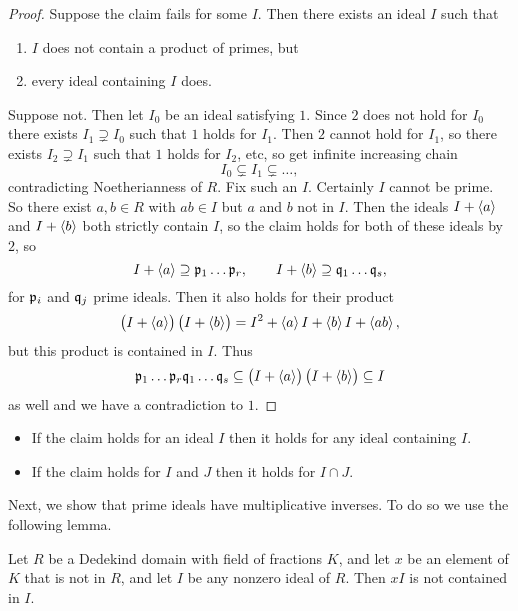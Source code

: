 \begin{proof}
Suppose the claim fails for some $ I $. Then there exists an ideal $ I $ such that
\begin{enumerate}
\item $ I $ does not contain a product of primes, but
\item every ideal containing $ I $ does.
\end{enumerate}
Suppose not. Then let $ I_0 $ be an ideal satisfying $ 1 $. Since $ 2 $ does not hold for $ I_0 $ there exists $ I_1 \supsetneq I_0 $ such that $ 1 $ holds for $ I_1 $. Then $ 2 $ cannot hold for $ I_1 $, so there exists $ I_2 \supsetneq I_1 $ such that $ 1 $ holds for $ I_2 $, etc, so get infinite increasing chain
$$ I_0 \subsetneq I_1 \subsetneq \dots, $$
contradicting Noetherianness of $ R $. Fix such an $ I $. Certainly $ I $ cannot be prime. So there exist $ a, b \in R $ with $ ab \in I $ but $ a $ and $ b $ not in $ I $. Then the ideals $ I + \left\langle a \right\rangle $ and $ I + \left\langle b \right\rangle $ both strictly contain $ I $, so the claim holds for both of these ideals by $ 2 $, so
$$ I + \left\langle a \right\rangle \supseteq \mathfrak{p}_1 \dots \mathfrak{p}_r, \qquad I + \left\langle b \right\rangle \supseteq \mathfrak{q}_1 \dots \mathfrak{q}_s, $$
for $ \mathfrak{p}_i $ and $ \mathfrak{q}_j $ prime ideals. Then it also holds for their product
$$ \br{I + \abr{a}}\br{I + \abr{b}} = I^2 + \abr{a}I + \abr{b}I + \abr{ab}, $$
but this product is contained in $ I $. Thus
$$ \pp_1 \dots \pp_r\qq_1 \dots \qq_s \subseteq \br{I + \abr{a}}\br{I + \abr{b}} \subseteq I $$
as well and we have a contradiction to $ 1 $.
\end{proof}

\begin{note*}
\hfill
\begin{itemize}
\item If the claim holds for an ideal $ I $ then it holds for any ideal containing $ I $.
\item If the claim holds for $ I $ and $ J $ then it holds for $ I \cap J $.
\end{itemize}
\end{note*}

Next, we show that prime ideals have multiplicative inverses. To do so we use the following lemma.

\begin{lemma}
\label{lem:11.1.7}
Let $ R $ be a Dedekind domain with field of fractions $ K $, and let $ x $ be an element of $ K $ that is not in $ R $, and let $ I $ be any nonzero ideal of $ R $. Then $ xI $ is not contained in $ I $.
\end{lemma}

